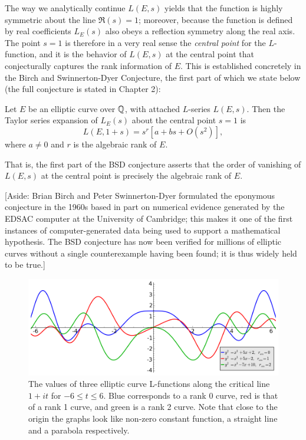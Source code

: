 \documentclass[10pt]{article}
\begin{document}
The way we analytically continue $L(E,s)$ yields that the function is highly symmetric about the line $\Re(s)=1$; moreover, because the function is defined by real coefficients $L_E(s)$ also obeys a reflection symmetry along the real axis. The point $s=1$ is therefore in a very real sense the {\it central point} for the $L$-function, and it is the behavior of $L(E,s)$ at the central point that conjecturally captures the rank information of $E$. This is established concretely in the Birch and Swinnerton-Dyer Conjecture, the first part of which we state below (the full conjecture is stated in Chapter 2):

\begin{conjecture}
Let $E$ be an elliptic curve over $\mathbb{Q}$, with attached $L$-series $L(E,s)$. Then the Taylor series expansion of $L_E(s)$ about the central point $s=1$ is
\begin{equation}
L(E,1+s) = s^r\left[a  + bs + O(s^2)\right],
\end{equation}
where
$a \ne 0$ and $r$ is the algebraic rank of $E$.
\end{conjecture}
That is, the first part of the BSD conjecture asserts that the order of vanishing of $L(E,s)$ at the central point is precisely the algebraic rank of $E$.

[Aside: Brian Birch and Peter Swinnerton-Dyer formulated the eponymous conjecture in the 1960s based in part on numerical evidence generated by the EDSAC computer at the University of Cambridge; this makes it one of the first instances of computer-generated data being used to support a mathematical hypothesis. The BSD conjecture has now been verified for millions of elliptic curves without a single counterexample having been found; it is thus widely held to be true.]

\begin{figure}[!h]
    \centering
    \includegraphics[width=1.0\textwidth]{graphics/L-functions_at_origin.png}
    \caption{The values of three elliptic curve L-functions along the critical line $1+it$ for $-6 \le t \le 6$. Blue corresponds to a rank 0 curve, red is that of a rank 1 curve, and green is a rank 2 curve. Note that close to the origin the graphs look like non-zero constant function, a straight line and a parabola respectively.}
    \label{fig:L-functions_at_origin}
\end{figure}
\end{document}
